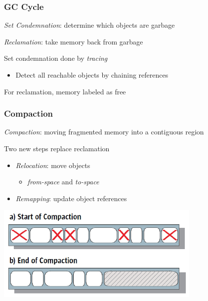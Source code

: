 \documentclass{beamer}
\newcommand{\linespace}{\vskip 0.25cm}
\begin{document}
\begin{frame}

\frametitle{GC Cycle}

\emph{Set Condemnation}: determine which objects are garbage 

\linespace
\linespace

\emph{Reclamation}: take memory back from garbage

\linespace
\linespace

Set condemnation done by \emph{tracing}
\begin{itemize}
\item Detect all reachable objects by chaining references
\end{itemize}

\linespace
\linespace

For reclamation, memory labeled as free

\end{frame}

\begin{frame}


\frametitle{Compaction}


\emph{Compaction}: moving fragmented memory into a contiguous region

\linespace

Two new steps replace reclamation
\begin{itemize}
\item \emph{Relocation}: move objects 
\begin{itemize}
\item \emph{from-space} and \emph{to-space}
\end{itemize}
\item \emph{Remapping}: update object references
\end{itemize}

\linespace

\begin{center}
\includegraphics[width=.60\textwidth]{Illustrations/bg_compaction.pdf}
\end{center}


\end{frame}
\end{document}

